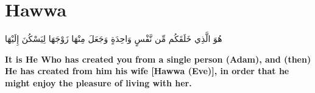 \chapter{Hawwa}
\begin{center}
    {\Huge    
        \begin{Arabic}
            هُوَ الَّذِي خَلَقَكُم مِّن نَّفْسٍ وَاحِدَةٍ وَجَعَلَ مِنْهَا زَوْجَهَا لِيَسْكُنَ إِلَيْهَا
        \end{Arabic}
    }    
\end{center}
\vspace*{\fill}
\vspace{3cm}
\begin{center}
    \large \textbf{It is He Who has created you from a single person (Adam), and (then) He has created from him his wife [Hawwa (Eve)], in order that he might enjoy the pleasure of living with her. }
\end{center}
